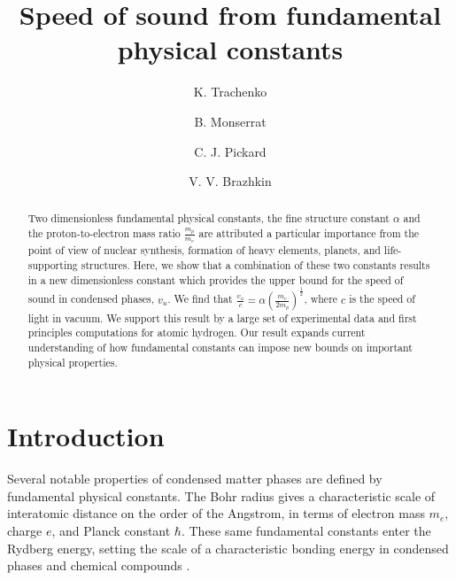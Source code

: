 \documentclass[aps,prl,groupedaddress,fleqn,twocolumn,10pt]{revtex4-1}
\begin{document}
\raggedbottom

\title{Speed of sound from fundamental physical constants}
\author{K. Trachenko}
\author{B. Monserrat}
\author{C. J. Pickard}
\author{V. V. Brazhkin}

\begin{abstract}
Two dimensionless fundamental physical constants, the fine structure constant $\alpha$ and the proton-to-electron mass ratio $\frac{m_p}{m_e}$ are attributed a particular importance from the point of view of nuclear synthesis, formation of heavy elements, planets, and life-supporting structures. Here, we show that a combination of these two constants results in a new dimensionless constant which provides the upper bound for the speed of sound in condensed phases, $v_u$. We find that $\frac{v_u}{c}=\alpha\left(\frac{m_e}{2m_p}\right)^{\frac{1}{2}}$, where $c$ is the speed of light in vacuum. We support this result by a large set of experimental data and first principles computations for atomic hydrogen. Our result expands current understanding of how fundamental constants can impose new bounds on important physical properties.
\end{abstract}

\maketitle

\section{Introduction}

Several notable properties of condensed matter phases are defined by fundamental physical constants. The Bohr radius gives a characteristic scale of interatomic distance on the order of the Angstrom, in terms of electron mass $m_e$, charge $e$, and Planck constant $\hbar$. These same fundamental constants enter the Rydberg energy, setting the scale of a characteristic bonding energy in condensed phases and chemical compounds \cite{ashcroft}.
\end{document}
